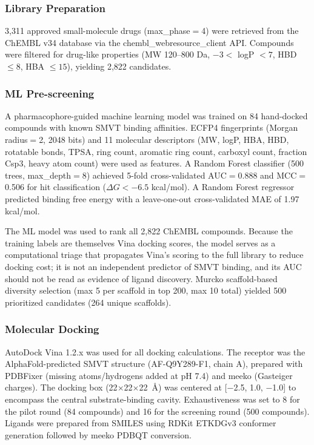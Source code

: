 \documentclass[pdflatex,sn-nature]{sn-jnl}
\begin{document}
\subsubsection*{Library Preparation}
3,311 approved small-molecule drugs (max\_phase$=$4) were retrieved from the ChEMBL v34 database via the chembl\_webresource\_client API. Compounds were filtered for drug-like properties (MW 120--800 Da, $-3 <$ logP $< 7$, HBD $\leq 8$, HBA $\leq 15$), yielding 2,822 candidates.

\subsubsection*{ML Pre-screening}
A pharmacophore-guided machine learning model was trained on 84 hand-docked compounds with known SMVT binding affinities. ECFP4 fingerprints (Morgan radius$=$2, 2048 bits) and 11 molecular descriptors (MW, logP, HBA, HBD, rotatable bonds, TPSA, ring count, aromatic ring count, carboxyl count, fraction Csp3, heavy atom count) were used as features. A Random Forest classifier (500 trees, max\_depth$=$8) achieved 5-fold cross-validated AUC$=$0.888 and MCC$=$0.506 for hit classification ($\Delta G < -6.5$ kcal/mol). A Random Forest regressor predicted binding free energy with a leave-one-out cross-validated MAE of 1.97 kcal/mol.

The ML model was used to rank all 2,822 ChEMBL compounds. Because the training labels are themselves Vina docking scores, the model serves as a computational triage that propagates Vina's scoring to the full library to reduce docking cost; it is not an independent predictor of SMVT binding, and its AUC should not be read as evidence of ligand discovery. Murcko scaffold-based diversity selection (max 5 per scaffold in top 200, max 10 total) yielded 500 prioritized candidates (264 unique scaffolds).

\subsubsection*{Molecular Docking}
AutoDock Vina 1.2.x was used for all docking calculations. The receptor was the AlphaFold-predicted SMVT structure (AF-Q9Y289-F1, chain A), prepared with PDBFixer (missing atoms/hydrogens added at pH 7.4) and meeko (Gasteiger charges). The docking box (22$\times$22$\times$22~\AA{}) was centered at [$-$2.5, 1.0, $-$1.0] to encompass the central substrate-binding cavity. Exhaustiveness was set to 8 for the pilot round (84 compounds) and 16 for the screening round (500 compounds). Ligands were prepared from SMILES using RDKit ETKDGv3 conformer generation followed by meeko PDBQT conversion.
\end{document}

